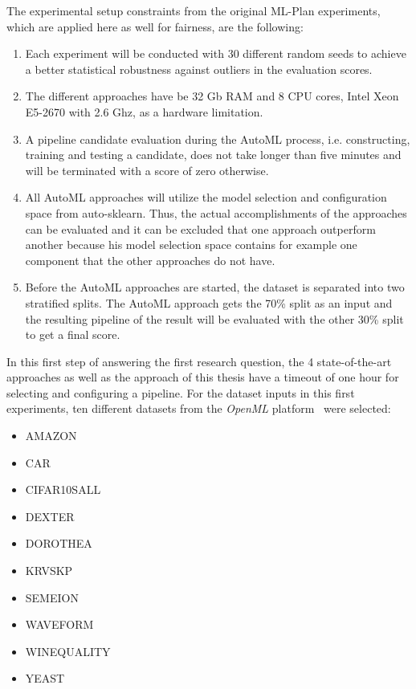 The experimental setup constraints from the original ML-Plan experiments, which are applied here as well for fairness, are the following:
\begin{enumerate}
    \item Each experiment will be conducted with 30 different random seeds to achieve a better statistical robustness against outliers in the evaluation scores.
    \item The different approaches have be 32 Gb RAM and 8 CPU cores, Intel Xeon E5-2670 with 2.6 Ghz, as a hardware limitation.
    \item A pipeline candidate evaluation during the AutoML process, i.e. constructing, training and testing a candidate, does not take longer than five minutes and will be terminated with a score of zero otherwise.
    \item All AutoML approaches will utilize the model selection and configuration space from auto-sklearn. Thus, the actual accomplishments of the approaches can be evaluated and it can be excluded that one approach outperform another because his model selection space contains for example one component that the other approaches do not have.
    \item Before the AutoML approaches are started, the dataset is separated into two stratified splits. The AutoML approach gets the 70\% split as an input and the resulting pipeline of the result will be evaluated with the other 30\% split to get a final score.
\end{enumerate}
In this first step of answering the first research question, the 4 state-of-the-art approaches as well as the approach of this thesis have a timeout of one hour for selecting and configuring a pipeline.
For the dataset inputs in this first experiments, ten different datasets from the \textit{OpenML} platform~\cite{Vanschoren-OpenML} were selected:
\begin{itemize}
    \item AMAZON
    \item CAR
    \item CIFAR10SALL
    \item DEXTER
    \item DOROTHEA
    \item KRVSKP
    \item SEMEION
    \item WAVEFORM
    \item WINEQUALITY
    \item YEAST
\end{itemize}

